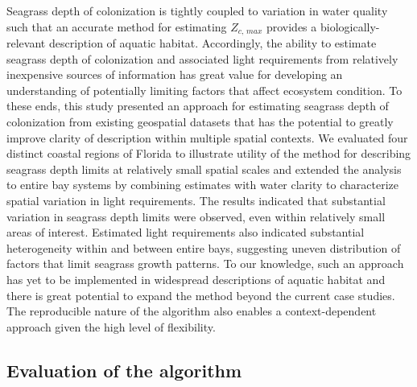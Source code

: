 \documentclass[letterpaper,12pt,oneside]{article}\usepackage[]{graphicx}\usepackage[]{color}
\begin{document}
Seagrass depth of colonization is tightly coupled to variation in water quality such that an accurate method for estimating $Z_{c,\,max}$ provides a biologically-relevant description of aquatic habitat.  Accordingly, the ability to estimate seagrass depth of colonization and associated light requirements from relatively inexpensive sources of information has great value for developing an understanding of potentially limiting factors that affect ecosystem condition.  To these ends, this study presented an approach for estimating seagrass depth of colonization from existing geospatial datasets that has the potential to greatly improve clarity of description within multiple spatial contexts.  We evaluated four distinct coastal regions of Florida to illustrate utility of the method for describing seagrass depth limits at relatively small spatial scales and extended the analysis to entire bay systems by combining estimates with water clarity to characterize spatial variation in light requirements.  The results indicated that substantial variation in seagrass depth limits were observed, even within relatively small areas of interest.  Estimated light requirements also indicated substantial heterogeneity within and between entire bays, suggesting uneven distribution of factors that limit seagrass growth patterns.  To our knowledge, such an approach has yet to be implemented in widespread descriptions of aquatic habitat and there is great potential to expand the method beyond the current case studies.  The reproducible nature of the algorithm also enables a context-dependent approach given the high level of flexibility.

\subsection{Evaluation of the algorithm}
\end{document}
